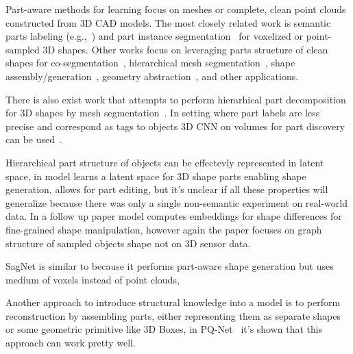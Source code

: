 
Part-aware methods for learning  focus on meshes or complete, clean point clouds constructed from 3D CAD models. The most closely related work  is semantic parts labeling (e.g.,~\cite{yi2016scalable,wang2017cnn,qi2017pointnet,mo2019partnet,yi2019gspn,zhang2019point}) and part instance segmentation~\cite{zhang2019point} for voxelized or point-sampled 3D shapes. Other works focus on leveraging parts structure of clean shapes for co-segmentation~\cite{chen2019bae,zhu2019cosegnet}, hierarchical mesh segmentation~\cite{yi2017learning}, shape assembly/generation~\cite{mo2019structurenet,wu2019sagnet,wu2019pq,mo2020pt2pc}, geometry abstraction~\cite{russell2009associative,li2017grass,sun2019learning}, and other applications.

There is also exist work that attempts to perform hierarhical part decomposition for 3D shapes by mesh segmentation~\cite{yi2017learning}. In setting where part labels are less precise and correspond as tags to objects 3D CNN on volumes for part discovery can be used~\cite{muralikrishnan2018tags2parts}.

Hierarchical part structure of objects can be effectevly represented in latent space, in \cite{mo2019structurenet} model learns a latent space for 3D shape parts enabling shape generation, allows for part editing, but it's unclear if all these properties will generalize because there was only a single non-semantic experiment on real-world data. In a follow up paper \cite{mo2020structedit} model computes embeddings for shape differences for fine-grained shape manipulation, however again the paper focuses on graph structure of sampled objects shape not on 3D sensor data.

SagNet \cite{wu2019sagnet} is similar to \cite{mo2019structurenet} because it performs part-aware shape generation but uses medium of voxels instead of point clouds,

Another approach to introduce structural knowledge into a model is to perform reconstruction by assembling parts, either representing them as separate shapes or some geometric primitive like 3D Boxes, in PQ-Net~\cite{wu2020pq} it's shown that this approach can work pretty well.


